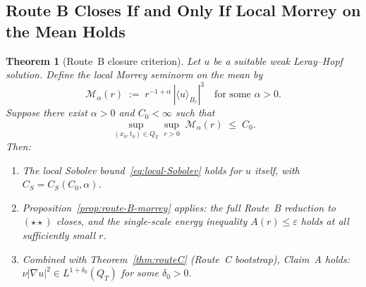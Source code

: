 \documentclass[11pt]{article}
\newtheorem{theorem}{Theorem}[section]
\theoremstyle{definition}
\theoremstyle{remark}
\begin{document}
\subsection{Route B Closes If and Only If Local Morrey on the Mean Holds}

\begin{theorem}[Route~B closure criterion]
\label{thm:routeB-closure}
  Let $u$ be a suitable weak Leray--Hopf solution.
  Define the local Morrey seminorm on the mean by
  \begin{equation}\label{eq:mean-morrey}
    \mathcal{M}_\alpha(r) \;:=\; r^{-1+\alpha}\,|\langle u\rangle_{B_r}|^3
    \quad\text{for some }\alpha>0.
  \end{equation}
  Suppose there exist $\alpha>0$ and $C_0<\infty$ such that
  \begin{equation}\label{eq:mean-morrey-bound}
    \sup_{(x_0,t_0)\in Q_T}\sup_{r>0}\;\mathcal{M}_\alpha(r)\;\leq\; C_0.
  \end{equation}
  Then:
  \begin{enumerate}
    \item[(a)] The local Sobolev bound~\eqref{eq:local-Sobolev} holds for $u$ itself,
      with $C_S = C_S(C_0,\alpha)$.
    \item[(b)] Proposition~\ref{prop:route-B-morrey} applies: the full Route~B reduction
      to~$(\star\star)$ closes, and the single-scale energy inequality
      $A(r)\leq\varepsilon$ holds at all sufficiently small $r$.
    \item[(c)] Combined with Theorem~\ref{thm:routeC} (Route~C bootstrap),
      Claim~A holds: $\nu|\nabla u|^2\in L^{1+\delta_0}(Q_T)$ for some $\delta_0>0$.
  \end{enumerate}
\end{theorem}
\end{document}
